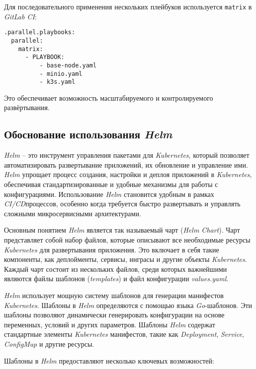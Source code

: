 Для последовательного применения нескольких плейбуков используется \lstinline{matrix} в \textit{GitLab CI}:

\begin{lstlisting}
.parallel.playbooks:
  parallel:
    matrix:
      - PLAYBOOK:
          - base-node.yaml
          - minio.yaml
          - k3s.yaml
\end{lstlisting}

Это обеспечивает возможность масштабируемого и контролируемого развёртывания.


\subsection{Обоснование использования \textit{Helm}}

\textit{Helm} -- это инструмент управления пакетами для \textit{Kubernetes}, который позволяет автоматизировать развертывание приложений, их обновление и управление ими. \textit{Helm} упрощает процесс создания, настройки и деплоя приложений в \textit{Kubernetes}, обеспечивая стандартизированные и удобные механизмы для работы с конфигурациями. Использование \textit{Helm} становится удобным в рамках \textit{CI/CD}процессов, особенно когда требуется быстро развертывать и управлять сложными микросервисными архитектурами.

Основным понятием \textit{Helm} является так называемый чарт (\textit{Helm Chart}). Чарт представляет собой набор файлов, которые описывают все необходимые ресурсы \textit{Kubernetes} для развертывания приложения. Это включает в себя такие компоненты, как деплойменты, сервисы, инграсы и другие объекты \textit{Kubernetes}. Каждый чарт состоит из нескольких файлов, среди которых важнейшими являются файлы шаблонов (\textit{templates}) и файл конфигурации \textit{values.yaml}.

\textit{Helm} использует мощную систему шаблонов для генерации манифестов \textit{Kubernetes}. Шаблоны в \textit{Helm} определяются с помощью языка \textit{Go}-шаблонов. Эти шаблоны позволяют динамически генерировать конфигурации на основе переменных, условий и других параметров. Шаблоны \textit{Helm} содержат стандартные элементы \textit{Kubernetes} манифестов, такие как \textit{Deployment}, \textit{Service}, \textit{ConfigMap} и другие ресурсы. 

Шаблоны в \textit{Helm} предоставляют несколько ключевых возможностей:

